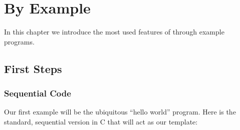 %
% 
% 
% 
% 
% 
% 
%

\chapter{\openshmem By Example}
\label{chp:example}

In this chapter we introduce the most used features of \openshmem
through example programs.

\section{First Steps}

\subsection{Sequential Code}

Our first example will be the ubiquitous ``hello world'' program.
Here is the standard, sequential version in C that will act as our
template:

